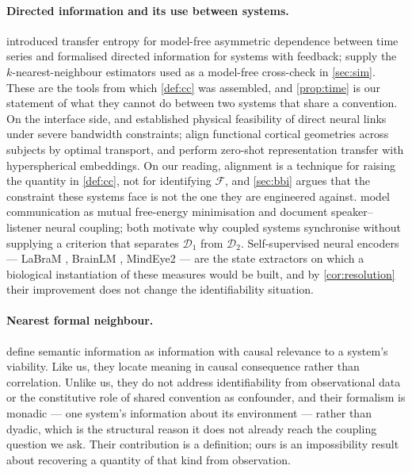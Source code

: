 \documentclass[11pt,a4paper]{article}
\theoremstyle{plain}
\theoremstyle{definition}
\theoremstyle{remark}
\newcommand{\Fc}{\mathcal{F}}
\newcommand{\Dy}{\mathcal{D}}
\begin{document}
\paragraph{Directed information and its use between systems.}
\citet{schreiber2000measuring} introduced transfer entropy for model-free asymmetric
dependence between time series and \citet{massey1990causality} formalised directed information
for systems with feedback; \citet{kraskov2004estimating} supply the $k$-nearest-neighbour
estimators used as a model-free cross-check in \cref{sec:sim}. These are the tools from which
\cref{def:cc} was assembled, and \cref{prop:time} is our statement of what they cannot do
between two systems that share a convention. On the interface side,
\citet{pais2013brain, rao2014direct} and \citet{jiang2019brainnet} established physical
feasibility of direct neural links under severe bandwidth constraints;
\citet{thual2022aligning} align functional cortical geometries across subjects by optimal
transport, and \citet{nakamura2024unsupervised} perform zero-shot representation transfer with
hyperspherical embeddings. On our reading, alignment is a technique for raising the quantity in
\cref{def:cc}, not for identifying $\Fc$, and \cref{sec:bbi} argues that the constraint these
systems face is not the one they are engineered against. \citet{friston2015active} model
communication as mutual free-energy minimisation and \citet{hasson2010speaker} document
speaker--listener neural coupling; both motivate why coupled systems synchronise without
supplying a criterion that separates $\Dy_1$ from $\Dy_2$. Self-supervised neural encoders
--- LaBraM \citep{jiang2024labram}, BrainLM \citep{caro2024brainlm}, MindEye2
\citep{scotti2024mindeye2} --- are the state extractors on which a biological instantiation of
these measures would be built, and by \cref{cor:resolution} their improvement does not change
the identifiability situation.

\paragraph{Nearest formal neighbour.}
\citet{kolchinsky2018semantic} define semantic information as information with causal relevance to a system's
viability. Like us, they locate meaning in causal consequence rather than correlation. Unlike us, they do not
address identifiability from observational data or the constitutive role of shared convention as confounder,
and their formalism is monadic --- one system's information about its environment --- rather than dyadic,
which is the structural reason it does not already reach the coupling question we ask. Their contribution is a
definition; ours is an impossibility result about recovering a quantity of that kind from observation.
\end{document}
